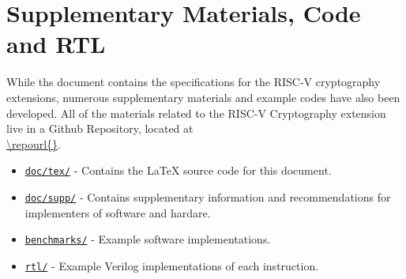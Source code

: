 
\newpage
\section{Supplementary Materials, Code and RTL}

While ths document contains the specifications for the RISC-V cryptography
extensions, numerous supplementary materials and example codes have
also been developed.
All of the materials related to the RISC-V Cryptography
extension live in a Github Repository, located at\\
\url{\repourl{}}.

\begin{itemize}
\item\href{\repourl{tree/master/doc}}{\tt doc/tex/}
- Contains the \LaTeX\xspace source code for this document.

\item\href{\repourl{tree/master/doc/supp/supplementary-info.adoc}}{\tt doc/supp/}
- Contains supplementary information and recommendations for implementers of
software and hardare.

\item\href{\repourl{tree/master/benchmarks}}{\tt benchmarks/}
- Example software implementations.

\item\href{\repourl{tree/master/rtl}}{\tt rtl/}
- Example Verilog implementations of each instruction.
\end{itemize}
